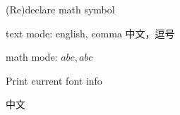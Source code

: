 \documentclass{ctexart}
\begin{document}
\setcounter{tcb@cnt@example}{2}
\begin{example}{(Re)declare math symbol}
  
  \LARGE
  text mode: english, comma 中文，逗号\par
  math mode: $abc, abc$
\end{example}

\begin{example*}{Print current font info}
  \newcommand{\printInternalCurrentFont}{%
    \expandafter\ttfamily
    \expandafter{\expandafter\string\the\font}%
  }
  
  中文\printInternalCurrentFont
\end{example*}
\end{document}
